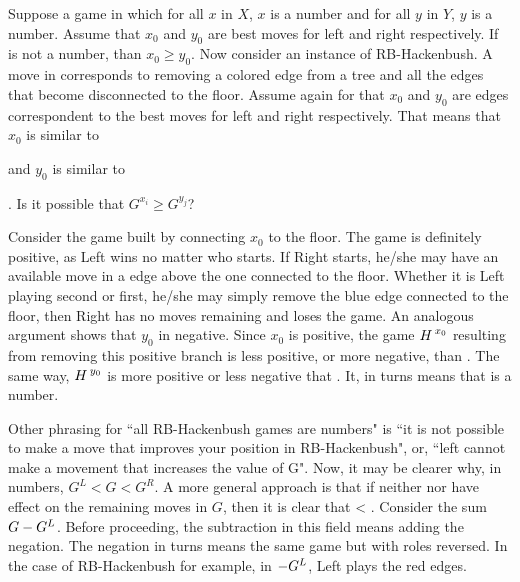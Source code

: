 Suppose a game  in which for all $x$ in $X$, $x$  is a number and for all $y$ in $Y$, $y$ is a number. Assume that $x_0$ and $y_0$ are best moves for left and right respectively. If \Gm{} is not a number, than $x_0 \ge y_0$. Now consider \Hm an instance of RB-Hackenbush. A move in \Hm corresponds to removing a colored edge from a tree and all the edges that become disconnected to the floor. Assume again for \Hm that $x_0$ and $y_0$ are edges correspondent to the best moves for left and right respectively. That means that $x_0$ is similar to  
 and $y_0$ is similar to 
. Is it possible that $G^{x_i} \ge G^{y_j}$?

Consider the game built by connecting $x_0$ to the floor. The game is definitely positive, as Left wins no matter who starts. If Right starts, he/she may have an available move in a edge above the one connected to the floor. Whether it is Left playing second or first, he/she may simply remove the blue edge connected to the floor, then Right has no moves remaining and loses the game. An analogous argument shows that $y_0$ in negative. Since $x_0$ is positive, the game $\mbox{$H\,$}^{x_0}$ resulting from removing this positive branch is less positive, or more negative, than \Hm. The same way, $\mbox{$H\,$}^{y_0}$ is more positive or less negative that \Hm. It, in turns means that \Hm is a number.

Other phrasing for ``all RB-Hackenbush games are numbers" is ``it is not possible to make a move that improves your position in  RB-Hackenbush", or, ``left cannot make a movement that increases the value of G". Now, it may be clearer why, in numbers, $G^L < G < G^R$. A more general approach is that if neither  nor  have effect on the remaining moves in $G$, then it is clear that  < \Gm{}. Consider the sum $\mbox{$G$} - \mbox{$G^L$}$. Before proceeding, the subtraction in this field means adding the negation. The negation in turns means the same game but with roles reversed. In the case of RB-Hackenbush for example, in ${-}\mbox{$G^L$}$, Left plays the red edges.

